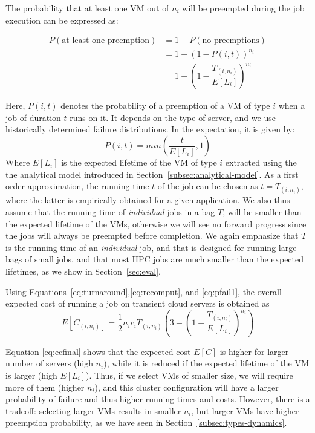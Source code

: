 The probability that at least one VM out of $n_i$ will be preempted during the job execution can be expressed as:

\begin{align}
  \label{eq:pfail1}
  P(\text{at least one preemption}) &= 1-P(\text{no preemptions}) \\
                                 &= 1-\left(1-P\left(i, t\right)\right)^{n_i} \\
                                 &= 1-\left(1-\dfrac{T_{( i,n_i )}}{E[L_i]}\right)^{n_i}      
\end{align}

Here, $P(i, t)$ denotes the probability of a preemption of a VM of type $i$ when a job of duration $t$ runs on it. 
%
It depends on the type of server, and we use historically determined failure distributions.
In the expectation, it is given by:
\begin{equation}
  \label{eq:pi}
  P(i, t) = min\left(\dfrac{t}{E[L_i]}, 1\right)
\end{equation}
Where $E[L_i]$ is the expected lifetime of the VM of type $i$ extracted using the the analytical model introduced in Section~\ref{subsec:analytical-model}.
As a first order approximation, the running time $t$ of the job can be chosen as $t=T_{( i,n_i )}$, where the latter is empirically obtained for a given application.
We also thus assume that the running time of \emph{individual} jobs in a bag $T$, will be smaller than the expected lifetime of the VMs, otherwise we will see no forward progress since the jobs will always be preempted before completion.
We again emphasize that $T$ is the running time of an \emph{individual} job, and that \sysname is designed for running large bags of small jobs, and that most HPC jobs are much smaller than the expected lifetimes, as we show in Section~\ref{sec:eval}. 



Using Equations~\ref{eq:turnaround},\ref{eq:recomput}, and \ref{eq:pfail1}, the overall expected cost of running a job on transient cloud servers is obtained as
\begin{equation}
  \label{eq:ecfinal}
  E[C_{( i,n_i )}] = \frac{1}{2}n_i c_i T_{( i,n_i )}\left(3 - \left(1-\dfrac{T_{( i,n_i )}}{E[L_i]}\right)^{n_i}\right)
\end{equation}

Equation \ref{eq:ecfinal} shows that the expected cost $E[C]$ is higher for larger number of servers (high $n_i$), while it is reduced if the expected lifetime of the VM is larger (high $E[L_i]$). 
%
Thus, if we select VMs of smaller size, we will require more of them (higher $n_i$), and this cluster configuration will have a larger probability of failure and thus higher running times and costs.
However, there is a tradeoff: selecting larger VMs results in smaller $n_i$, but larger VMs have higher preemption probability, as we have seen in Section~\ref{subsec:types-dynamics}. 



